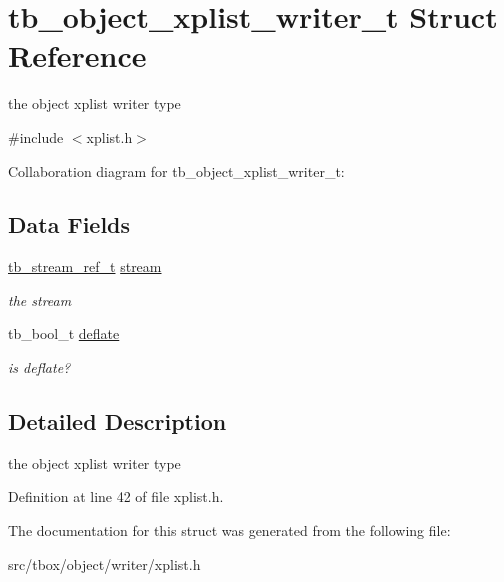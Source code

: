 \hypertarget{structtb__object__xplist__writer__t}{\section{tb\-\_\-object\-\_\-xplist\-\_\-writer\-\_\-t Struct Reference}
\label{structtb__object__xplist__writer__t}
}


the object xplist writer type  




{\ttfamily \#include $<$xplist.\-h$>$}



Collaboration diagram for tb\-\_\-object\-\_\-xplist\-\_\-writer\-\_\-t\-:
\subsection*{Data Fields}
\begin{DoxyCompactItemize}
\item 
\hypertarget{structtb__object__xplist__writer__t_a310f55fe7a64b2a6f1c29af181225657}{\hyperlink{structtb__stream__ref__t}{tb\-\_\-stream\-\_\-ref\-\_\-t} \hyperlink{structtb__object__xplist__writer__t_a310f55fe7a64b2a6f1c29af181225657}{stream}}\label{structtb__object__xplist__writer__t_a310f55fe7a64b2a6f1c29af181225657}

\begin{DoxyCompactList}\small\item\em the stream \end{DoxyCompactList}\item 
\hypertarget{structtb__object__xplist__writer__t_aef0727d5e1fb41e67c1d093476ff78a3}{tb\-\_\-bool\-\_\-t \hyperlink{structtb__object__xplist__writer__t_aef0727d5e1fb41e67c1d093476ff78a3}{deflate}}\label{structtb__object__xplist__writer__t_aef0727d5e1fb41e67c1d093476ff78a3}

\begin{DoxyCompactList}\small\item\em is deflate? \end{DoxyCompactList}\end{DoxyCompactItemize}


\subsection{Detailed Description}
the object xplist writer type 

Definition at line 42 of file xplist.\-h.



The documentation for this struct was generated from the following file\-:\begin{DoxyCompactItemize}
\item 
src/tbox/object/writer/xplist.\-h\end{DoxyCompactItemize}
